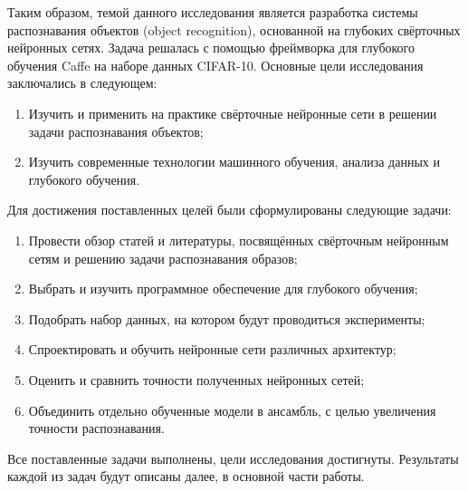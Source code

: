Таким образом, темой данного исследования является разработка системы распознавания объектов 
(object recognition), основанной на глубоких свёрточных нейронных сетях. Задача решалась с помощью  
фреймворка для глубокого обучения Caffe на наборе данных CIFAR-10. 
Основные цели исследования заключались в следующем:
\begin{enumerate}
    \item Изучить и применить на практике свёрточные нейронные сети в решении задачи распознавания 
    объектов;
    \item Изучить современные технологии машинного обучения, анализа данных и глубокого  
    обучения.
\end{enumerate}
Для достижения поставленных целей были сформулированы следующие задачи:
\begin{enumerate}
    \item Провести обзор статей и литературы, посвящённых свёрточным нейронным сетям и решению 
    задачи распознавания образов;
    \item Выбрать и изучить программное обеспечение для глубокого обучения;
    \item Подобрать набор данных, на котором будут проводиться эксперименты;
    \item Спроектировать и обучить нейронные сети различных архитектур;
    \item Оценить и сравнить точности полученных нейронных сетей;
    \item Объединить отдельно обученные модели в ансамбль, с целью увеличения точности 
    распознавания.
\end{enumerate}
Все поставленные задачи выполнены, цели исследования достигнуты. Результаты каждой из задач будут 
описаны далее, в основной части работы.
